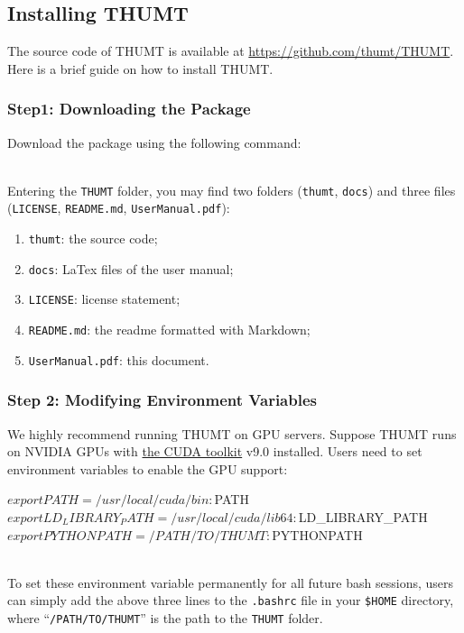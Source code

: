\documentclass{article}
\begin{document}
\subsection{Installing THUMT}
The source code of THUMT is available at \href{https://github.com/thumt/THUMT}{https://github.com/thumt/THUMT}. Here is a brief guide on how to install THUMT.

\subsubsection{Step1: Downloading the Package}
Download the package using the following command:
\\
\\
Entering the \verb|THUMT| folder, you may find two folders (\verb|thumt|, \verb|docs|) and three files (\verb|LICENSE|, \verb|README.md|, \verb|UserManual.pdf|):
\begin{enumerate}
\item \verb|thumt|: the source code;
\item \verb|docs|: LaTex files of the user manual;
\item \verb|LICENSE|: license statement;
\item \verb|README.md|: the readme formatted with Markdown;
\item \verb|UserManual.pdf|: this document.
\end{enumerate}

\subsubsection{Step 2: Modifying Environment Variables}
We highly recommend running THUMT on GPU servers. Suppose THUMT runs on NVIDIA GPUs with \href{https://developer.nvidia.com/cuda-toolkit}{the CUDA toolkit} v9.0 installed. Users need to set environment variables to enable the GPU support:
\\
\begin{everbatim}
$ export PATH=/usr/local/cuda/bin:$PATH
$ export LD_LIBRARY_PATH=/usr/local/cuda/lib64:$LD_LIBRARY_PATH
$ export PYTHONPATH=/PATH/TO/THUMT:$PYTHONPATH
\end{everbatim}
\\
To set these environment variable permanently for all future bash sessions, users can simply add the above three lines to the \verb|.bashrc| file in your \verb|$HOME| directory, where ``\verb|/PATH/TO/THUMT|'' is the path to the \verb|THUMT| folder.
\end{document}
